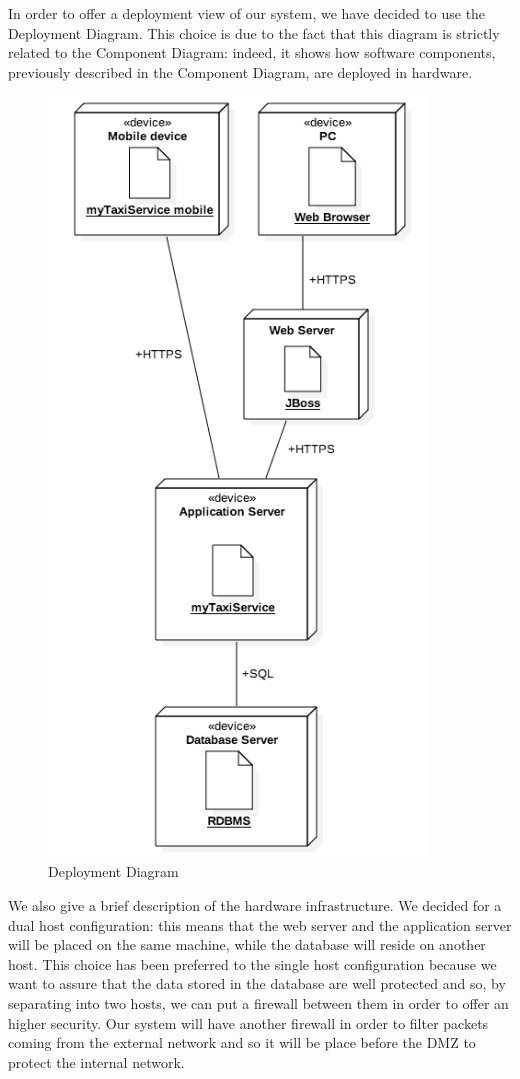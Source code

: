 In order to offer a deployment view of our system, we have decided to use the Deployment Diagram. This choice is due to the fact that this diagram is strictly related to the Component Diagram: indeed, it shows how software components, previously described in the Component Diagram, are deployed in hardware. 

\begin{figure}[H]
        \centering
        \includegraphics[width=10cm]{./Images/DeploymentDiagram1.png}
        \caption{Deployment Diagram}
\end{figure}

We also give a brief description of the hardware infrastructure. 
\newline
We decided for a dual host configuration: this means that the web server and the application server will be placed on the same machine, while the database will reside on another host. This choice has been preferred to the single host configuration because we want to assure that the data stored in the database are well protected and so, by separating into two hosts, we can put a firewall between them in order to offer an higher security. 
\newline
Our system will have another firewall in order to filter packets coming from the external network and so it will be place before the DMZ to protect the internal network.

